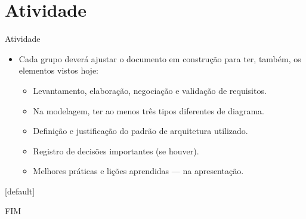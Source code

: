 \documentclass{beamer}
\begin{document}
\section{Atividade}

\begin{frame}{Atividade}
    \begin{itemize}
        \justifying
        \item Cada grupo deverá ajustar o documento em construção para ter, também, os elementos vistos hoje:
        	\begin{itemize}
        		\item Levantamento, elaboração, negociação e validação de requisitos.
        		\item Na modelagem, ter ao menos três tipos diferentes de diagrama.
        		\item Definição e justificação do padrão de arquitetura utilizado.
        		\item Registro de decisões importantes (se houver).
        		\item Melhores práticas e lições aprendidas --- na apresentação.
        	\end{itemize}
    \end{itemize}
\end{frame}

[default]



\begin{frame}
    \centering
    \Large
    FIM
\end{frame}
    
\end{document}
